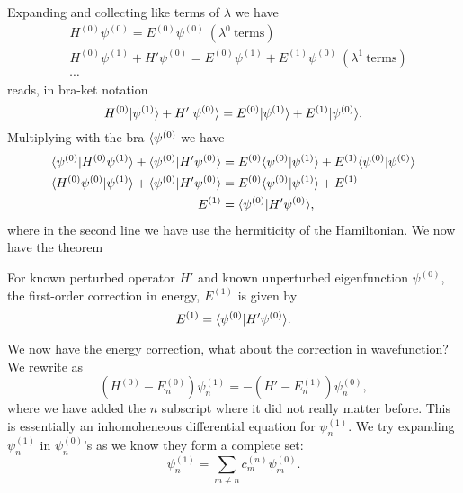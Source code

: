 Expanding and collecting like terms of $\lambda$ we have 
\begin{subequations}
\begin{align}
&H^{(0)}\psi^{(0)}=E^{(0)}\psi^{(0)}\ (\lambda^0\ \text{terms})\\
&H^{(0)}\psi^{(1)}+H'\psi^{(0)}=E^{(0)}\psi^{(1)}+E^{(1)}\psi^{(0)}\ (\lambda^1\ \text{terms})\label{1stpert}\\
&\cdots\nonumber
\end{align}
\end{subequations}
 reads, in bra-ket notation
\begin{equation}
\label{h0h1}
H^{(0)}|\psi^{(1)}\rangle+H'|\psi^{(0)}\rangle=E^{(0)}|\psi^{(1)}\rangle+E^{(1)}|\psi^{(0)}\rangle.
\end{equation}
Multiplying with the bra $\langle\psi^{(0)}$ we have
\begin{equation}
\begin{aligned}
\langle\psi^{(0)} |H^{(0)}\psi^{(1)}\rangle+\langle\psi^{(0)} |H'\psi^{(0)}\rangle&=E^{(0)}\langle\psi^{(0)} |\psi^{(1)}\rangle+E^{(1)}\langle\psi^{(0)} |\psi^{(0)}\rangle\\
\langle H^{(0)}\psi^{(0)} |\psi^{(1)}\rangle+\langle\psi^{(0)} |H'\psi^{(0)}\rangle&=E^{(0)}\langle\psi^{(0)} |\psi^{(1)}\rangle+E^{(1)}\\
E^{(1)}&=\langle\psi^{(0)} |H'\psi^{(0)}\rangle, 
\end{aligned}
\end{equation}
where in the second line we have use the hermiticity of the Hamiltonian. 
We now have the theorem
\begin{thrm}
\label{1stpert}
For known perturbed operator $H'$ and known unperturbed eigenfunction 
$\psi^{(0)}$, the first-order correction in energy, $E^{(1)}$ is given by
\begin{equation}
E^{(1)}=\langle \psi^{(0)}|H'\psi^{(0)}\rangle.
\end{equation}
\end{thrm}
We now have the energy correction, what about the correction in wavefunction? We rewrite  as 
\begin{equation}
\label{1stpertrew}
(H^{(0)}-E^{(0)}_n)\psi^{(1)}_n=-(H'-E^{(1)}_n)\psi_n^{(0)}, 
\end{equation}
where we have added the $n$ subscript where it did not really matter before. 
This is essentially an inhomoheneous differential equation for $\psi_n^{(1)}$. 
We try expanding $\psi_n^{(1)}$ in $\psi_n^{(0)}$'s as we know they form a 
complete set: 
\begin{equation}
\psi^{(1)}_n=\sum_{m\neq n}c_m^{(n)}\psi^{(0)}_m.
\end{equation}
